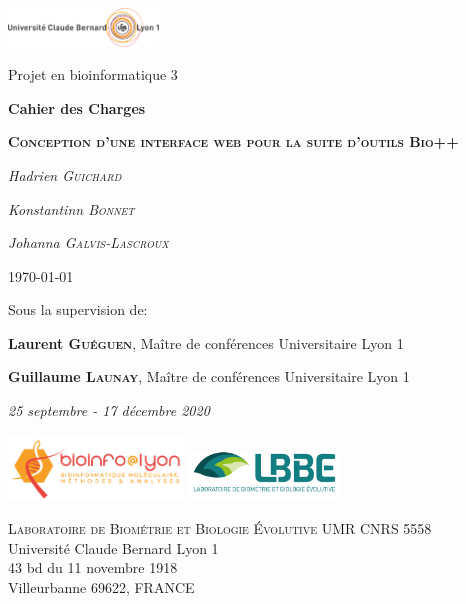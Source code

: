 \begin{titlepage}
	\centering
	\includegraphics[width=0.3\textwidth]{fig/lyon1.png}\par
	\vspace{0.1cm}
	{\normalsize Projet en bioinformatique 3\par}  
	\vspace{0.5cm}
	{\large\bfseries Cahier des Charges\par}
	\vspace{2.5cm}
	{\huge\bfseries \textsc{Conception d'une interface web pour la suite d'outils Bio++}\par}
	\vspace{0.4cm}
	{\normalsize\itshape Hadrien \textsc{Guichard}\par}
	{\normalsize\itshape Konstantinn \textsc{Bonnet}\par}
	{\normalsize\itshape Johanna \textsc{Galvis-Lascroux}\par}
	\vfill
	{\large\today \par}  %
	\vfill
	Sous la supervision de:\par
	\textbf{Laurent \textsc{Guéguen}}, Maître de conférences Universitaire Lyon 1\par
	\textbf{Guillaume \textsc{Launay}}, Maître de conférences Universitaire Lyon 1\par
	\vspace{0.4cm}
	{\small\itshape 25 septembre - 17 décembre 2020\par}
	\vfill
	\includegraphics[width=0.35\textwidth]{fig/bioinfo.png}
	\hfill
	\includegraphics[width=0.3\textwidth]{fig/lbbe_new2.png}\par
	\vspace{0.5cm}
	\begin{minipage}{\linewidth}
		\centering
		\small
		\textsc{Laboratoire de Biométrie et Biologie Évolutive UMR CNRS 5558}\\
		Université Claude Bernard Lyon 1\\
		43 bd du 11 novembre 1918\\
		Villeurbanne 69622, FRANCE
		
	\end{minipage}
\end{titlepage}
